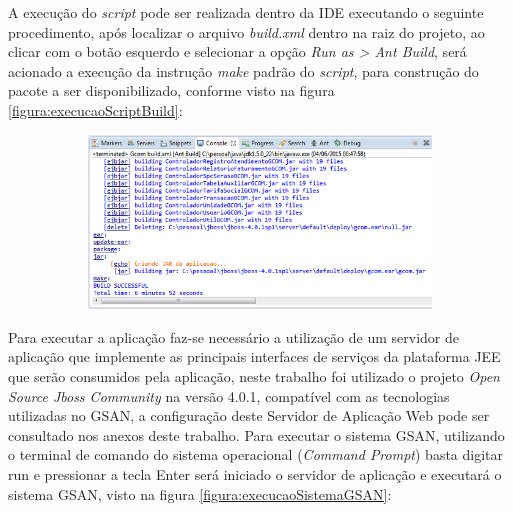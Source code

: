 A execução do \textit{script} pode ser realizada dentro da IDE executando o seguinte procedimento, após localizar o arquivo \textit{build.xml} dentro na raiz do projeto, ao clicar com o botão esquerdo e selecionar a opção \textit{Run as > Ant Build}, será acionado a execução da instrução \textit{make} padrão do \textit{script}, para construção do pacote a ser disponibilizado, conforme visto na figura \ref{figura:execucaoScriptBuild}:	
		

\begin{figure}[H]
	\centering
	\caption{\textbf{Execução do \textit{script} de build}}
	\label{figura:execucaoScriptBuild}
	\begin{subfigure}[H]{\textwidth}
		\centering
	\includegraphics{figuras/build_ant.png}
	\end{subfigure}
\end{figure}		
		

Para executar a aplicação faz-se necessário a utilização de um servidor de aplicação que implemente as principais interfaces de serviços da plataforma JEE que serão consumidos pela aplicação, neste trabalho foi utilizado o projeto \textit{Open Source Jboss Community} na versão 4.0.1, compatível com as tecnologias utilizadas no GSAN, a configuração deste Servidor de Aplicação Web pode ser consultado nos anexos deste trabalho.
Para executar o sistema GSAN, utilizando o terminal de comando do sistema operacional (\textit{Command Prompt}) basta digitar run e pressionar a tecla Enter será iniciado o servidor de aplicação e executará o sistema GSAN, visto na figura \ref{figura:execucaoSistemaGSAN}:



